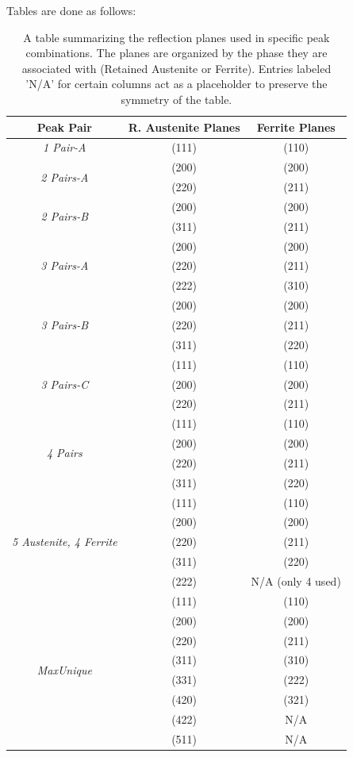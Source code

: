 \documentclass[10pt]{article}
\begin{document}
Tables are done as follows:
\begin{table}[h]
    \begin{tabular}{||c c c||}
    \hline
    \textbf{Peak Pair} & \textbf{R. Austenite Planes} & \textbf{Ferrite Planes} \\ [0.5ex] 
    \hline\hline
    \emph{1 Pair-A} & (111) & (110) \\ 
    \hline
    \multirow{2}{*}{\emph{2 Pairs-A}} & (200) & (200) \\
    & (220) & (211) \\
    \hline
    \multirow{2}{*}{\emph{2 Pairs-B}} & (200) & (200) \\
    & (311) & (211) \\
    \hline
    \multirow{3}{*}{\emph{3 Pairs-A}} & (200) & (200) \\
    & (220) & (211) \\
    & (222) & (310) \\
    \hline
    \multirow{3}{*}{\emph{3 Pairs-B}} & (200) & (200) \\
    & (220) & (211) \\
    & (311) & (220) \\
    \hline
    \multirow{3}{*}{\emph{3 Pairs-C}} & (111) & (110) \\
    & (200) & (200) \\
    & (220) & (211) \\
    \hline
    \multirow{4}{*}{\emph{4 Pairs}} & (111) & (110) \\
    & (200) & (200) \\
    & (220) & (211) \\
    & (311) & (220) \\
    \hline
    \multirow{5}{*}{\emph{5 Austenite, 4 Ferrite}} & (111) & (110) \\
    & (200) & (200) \\
    & (220) & (211) \\
    & (311) & (220) \\
    & (222) & N/A (only 4 used) \\

    \hline
    \multirow{8}{*}{\emph{MaxUnique}} & (111) & (110) \\
    & (200) & (200) \\
    & (220) & (211) \\
    & (311) & (310) \\
    & (331) & (222) \\
    & (420) & (321) \\
    & (422) & N/A \\
    & (511) & N/A \\
    \hline
   \end{tabular}
   \caption{A table summarizing the reflection planes used in specific peak combinations. The planes are organized by
   the phase they are associated with (Retained Austenite or Ferrite). Entries labeled 'N/A' for certain columns act as a placeholder to preserve the symmetry of the table. 
   }
\end{table} 
\end{document}
